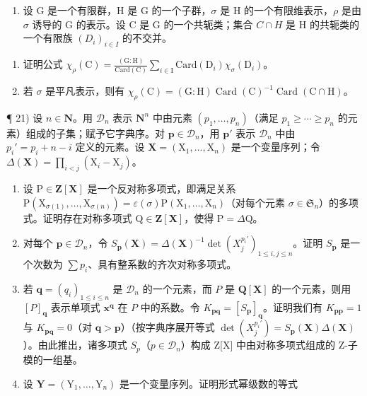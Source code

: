 \begin{enumerate}
\def\labelenumi{\arabic{enumi})}
\setcounter{enumi}{19}
\tightlist
\item
  设 G 是一个有限群，H 是 G 的一个子群，\(\sigma\) 是 H 的一个有限维表示，\(\rho\) 是由 \(\sigma\) 诱导的 G 的表示。设 C 是 G 的一个共轭类；集合 \(C \cap H\) 是 H 的共轭类的一个有限族 \((D_{i})_{i \in I}\) 的不交并。
\end{enumerate}

\begin{enumerate}
\def\labelenumi{\alph{enumi})}
\item
  证明公式 \(\chi_{\rho}(\mathrm{C}) = \frac{(\mathrm{G:H})}{\mathrm{Card}(\mathrm{C})}\sum_{i\in \mathrm{I}}\mathrm{Card}(\mathrm{D}_i)\chi_\sigma (\mathrm{D}_i)\)。
\item
  若 \(\sigma\) 是平凡表示，则有 \(\chi_{\rho}(\mathrm{C})=(\mathrm{G}:\mathrm{H})\operatorname{Card}(\mathrm{C})^{-1}\operatorname{Card}(\mathrm{C}\cap\mathrm{H})\)。
\end{enumerate}

¶ 21) 设 \(n \in \mathbf{N}\)。用 \(\mathcal{D}_{n}\) 表示 \(\mathbf{N}^{n}\) 中由元素 \((p_{1},\ldots,p_{n})\)（满足 \(p_{1} \geqslant \cdots \geqslant p_{n}\) 的元素）组成的子集；赋予它字典序。对 \(\mathbf{p} \in \mathcal{D}_{n}\)，用 \(\mathbf{p}'\) 表示 \(\mathcal{D}_{n}\) 中由 \(p_{i}' = p_{i} + n - i\) 定义的元素。设 \(\mathbf{X} = (\mathrm{X}_{1},\ldots,\mathrm{X}_{n})\) 是一个变量序列；令 \(\Delta(\mathbf{X}) = \prod_{i<j}(\mathrm{X}_{i} - \mathrm{X}_{j})\)。

\begin{enumerate}
\def\labelenumi{\alph{enumi})}
\item
  设 \(\mathrm{P} \in \mathbf{Z}[\mathbf{X}]\) 是一个反对称多项式，即满足关系 \(\mathrm{P}(\mathrm{X}_{\sigma(1)}, \ldots, \mathrm{X}_{\sigma(n)}) = \varepsilon(\sigma)\mathrm{P}(\mathrm{X}_1, \ldots, \mathrm{X}_n)\)（对每个元素 \(\sigma \in \mathfrak{S}_n\)）的多项式。证明存在对称多项式 \(\mathrm{Q} \in \mathbf{Z}[\mathbf{X}]\)，使得 \(\mathrm{P} = \Delta\mathrm{Q}\)。
\item
  对每个 \(\mathbf{p} \in \mathcal{D}_n\)，令 \(S_{\mathbf{p}}(\mathbf{X}) = \Delta(\mathbf{X})^{-1} \det(X_j^{p_i'})_{1 \leqslant i,j \leqslant n}\)。证明 \(S_{\mathbf{p}}\) 是一个次数为 \(\sum p_i\)、具有整系数的齐次对称多项式。
\item
  若 \(\mathbf{q} = (q_i)_{1\leqslant i\leqslant n}\) 是 \(\mathcal{D}_n\) 的一个元素，而 \(P\) 是 \(\mathbf{Q}[\mathbf{X}]\) 的一个元素，则用 \([P]_{\mathbf{q}}\) 表示单项式 \(\mathbf{x}^{\mathbf{q}}\) 在 \(P\) 中的系数。令 \(K_{\mathbf{pq}} = [S_{\mathbf{p}}]_{\mathbf{q}}\)。证明我们有 \(K_{\mathbf{pp}} = 1\) 与 \(K_{\mathbf{pq}} = 0\)（对 \(\mathbf{q} > \mathbf{p}\)）（按字典序展开等式 \(\det(X_j^{p_i'}) = S_{\mathbf{p}}(\mathbf{X})\Delta(\mathbf{X})\)）。由此推出，诸多项式 \(S_{p}\)（\(p \in \mathcal{D}_{n}\)）构成 Z{[}X{]} 中由对称多项式组成的 Z-子模的一组基。
\item
  设 \(\mathbf{Y} = (\mathrm{Y}_1, \ldots, \mathrm{Y}_n)\) 是一个变量序列。证明形式幂级数的等式
\end{enumerate}

